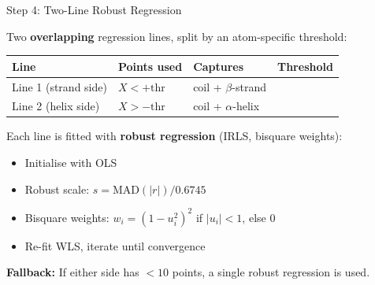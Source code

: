 \documentclass[aspectratio=169,11pt]{beamer}
\begin{document}
\begin{frame}[shrink=8]{Step 4: Two-Line Robust Regression}

Two \textbf{overlapping} regression lines, split by an atom-specific threshold:

\medskip
\begin{center}
\begin{tabular}{lllc}
\toprule
\textbf{Line} & \textbf{Points used} & \textbf{Captures} & \textbf{Threshold} \\
\midrule
\textcolor{strand}{Line 1 (strand side)} & $X < +\text{thr}$ & coil + $\beta$-strand &  \\
\textcolor{helix}{Line 2 (helix side)}  & $X > -\text{thr}$ & coil + $\alpha$-helix & \\
\bottomrule
\end{tabular}
\end{center}

\medskip
Each line is fitted with \textbf{robust regression} (IRLS, bisquare weights):
\begin{itemize}\setlength\itemsep{1pt}
  \item Initialise with OLS
  \item Robust scale: $s = \text{MAD}(|r|) / 0.6745$
  \item Bisquare weights: $w_i = (1 - u_i^2)^2$ if $|u_i| < 1$, else $0$
  \item Re-fit WLS, iterate until convergence
\end{itemize}

\smallskip
\textbf{Fallback:} If either side has $<10$ points, a single robust regression is used.
\end{frame}
\end{document}
